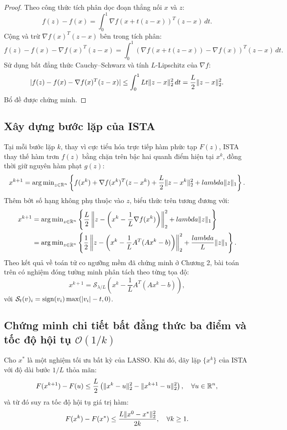\begin{proof}
Theo công thức tích phân dọc đoạn thẳng nối $x$ và $z$:
\[
f(z) - f(x) = \int_0^1 \nabla f(x + t(z - x))^T(z - x) \, dt.
\]
Cộng và trừ $\nabla f(x)^T(z - x)$ bên trong tích phân:
\[
f(z) - f(x) - \nabla f(x)^T(z - x) = \int_0^1 (\nabla f(x + t(z - x)) - \nabla f(x))^T(z - x) \, dt.
\]
Sử dụng bất đẳng thức Cauchy--Schwarz và tính $L$-Lipschitz của $\nabla f$:
\[
|f(z) - f(x) - \nabla f(x)^T(z - x)| \le \int_0^1 L t \|z - x\|_2^2 \, dt = \frac{L}{2} \|z - x\|_2^2.
\]
Bổ đề được chứng minh.
\end{proof}

\subsection{Xây dựng bước lặp của ISTA}
Tại mỗi bước lặp $k$, thay vì cực tiểu hóa trực tiếp hàm phức tạp $F(z)$, ISTA thay thế hàm trơn $f(z)$ bằng chặn trên bậc hai quanh điểm hiện tại $x^k$, đồng thời giữ nguyên hàm phạt $g(z)$:
\begin{equation}
    x^{k+1} = \operatorname{arg\,min}_{z \in \mathbb{R}^n} \left\{ f(x^k) + \nabla f(x^k)^T(z - x^k) + \frac{L}{2} \|z - x^k\|_2^2 + lambda \|z\|_1 \right\}.
\end{equation}
Thêm bớt số hạng không phụ thuộc vào $z$, biểu thức trên tương đương với:
\begin{align}
    x^{k+1} &= \operatorname{arg\,min}_{z \in \mathbb{R}^n} \left\{ \frac{L}{2} \left\| z - \left( x^k - \frac{1}{L} \nabla f(x^k) \right) \right\|_2^2 + lambda \|z\|_1 \right\} \notag \\
            &= \operatorname{arg\,min}_{z \in \mathbb{R}^n} \left\{ \frac{1}{2} \left\| z - \left( x^k - \frac{1}{L} A^T(Ax^k - b) \right) \right\|_2^2 + \frac{lambda}{L} \|z\|_1 \right\}.
\end{align}
Theo kết quả về toán tử co ngưỡng mềm đã chứng minh ở Chương 2, bài toán trên có nghiệm đóng tường minh phân tách theo từng tọa độ:
\begin{equation}
    x^{k+1} = \mathcal{S}_{\lambda/L} \left( x^k - \frac{1}{L} A^T(Ax^k - b) \right),
    \label{eq:ista_iteration}
\end{equation}
với $\mathcal{S}_t(v)_i = \operatorname{sign}(v_i) \max(|v_i| - t, 0)$.

\subsection{Chứng minh chi tiết bất đẳng thức ba điểm và tốc độ hội tụ $\mathcal{O}(1/k)$}
\begin{theorem}
Cho $x^*$ là một nghiệm tối ưu bất kỳ của LASSO. Khi đó, dãy lặp $\{x^k\}$ của ISTA với độ dài bước $1/L$ thỏa mãn:
\begin{equation}
    F(x^{k+1}) - F(u) \le \frac{L}{2} \left( \|x^k - u\|_2^2 - \|x^{k+1} - u\|_2^2 \right), \quad \forall u \in \mathbb{R}^n,
    \label{eq:three_point_inequality}
\end{equation}
và từ đó suy ra tốc độ hội tụ giá trị hàm:
\begin{equation}
    F(x^k) - F(x^*) \le \frac{L \|x^0 - x^*\|_2^2}{2k}, \quad \forall k \ge 1.
\end{equation}
\end{theorem}

